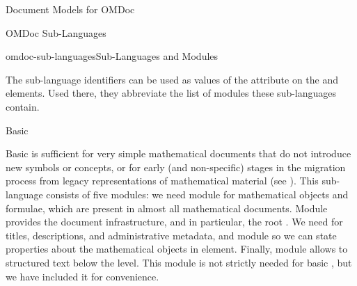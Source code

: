 \begin{module}[id=document-model]
\begin{omgroup}[id=document-model]{Document Models for OMDoc}
\begin{omgroup}[id=sub-languages]{OMDoc Sub-Languages}
\begin{module}[id=sub-languages]
\begin{myfig}{omdoc-sub-languages}{\omdoc Sub-Languages and Modules}
\end{myfig}

The sub-language identifiers can be used as values of the {}
attribute on the  and  elements. Used there, they
abbreviate the list of modules these sub-languages contain.


\begin{omgroup}[id=sub-languages.basic]{Basic \omdoc}

Basic \omdoc is sufficient for very simple mathematical documents that do not introduce
new symbols or concepts, or for early (and non-specific) stages in the migration process
from legacy representations of mathematical material (see {}). This
\omdoc sub-language consists of five modules: we need module {} for
mathematical objects and formulae, which are present in almost all mathematical documents.
Module {} provides the document infrastructure, and in particular, the
root  . We need {} for
titles, descriptions, and administrative metadata, and module {} so we
can state properties about the mathematical objects in  element.
Finally, module {} allows to structured text below the 
level. This module is not strictly needed for basic \omdoc, but we have included it for
convenience.
\end{omgroup}


\end{module}
\end{omgroup}
\end{omgroup}
\end{module}
